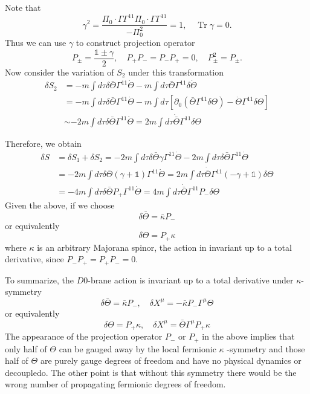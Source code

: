 \documentclass[graybox,envcountchap,sectrefs]{svmono}
\begin{document}
Note that
\begin{equation}
\gamma^{2}=\frac{\Pi_{0} \cdot \Gamma \Gamma^{11} \Pi_{0} \cdot \Gamma \Gamma^{11}}{-\Pi_{0}^{2}}=1, \quad \operatorname{Tr} \gamma=0.
\end{equation}
Thus we can use $\gamma$ to construct projection operator
\begin{equation}
P_{\pm}=\frac{\mathds{1} \pm \gamma}{2}, \quad P_{+} P_{-}=P_{-} P_{+}=0, \quad P_{\pm}^{2}=P_{\pm}.
\end{equation}
Now consider the variation of $S_{2}$ under this transformation
\begin{equation}
\begin{aligned}
\delta S_{2} &=-m \int d \tau \delta \bar{\Theta} \Gamma^{11} \dot{\Theta}-m \int d \tau \bar{\Theta} \Gamma^{11} \delta \dot{\Theta} \\
&=-m \int d \tau \delta \bar{\Theta} \Gamma^{11} \dot{\Theta}-m \int d \tau\left[\partial_{0}\left(\bar{\Theta} \Gamma^{11} \delta \Theta\right)-\dot{\Theta} \Gamma^{11} \delta \Theta\right] \\
& \sim-2 m \int d \tau \delta \bar{\Theta} \Gamma^{11} \dot{\Theta}=2 m \int d \tau \dot{\bar{\Theta}} \Gamma^{11} \delta \Theta
\end{aligned}
\end{equation}

Therefore, we obtain
\[
\begin{aligned}
\delta S &=\delta S_{1}+\delta S_{2}=-2 m \int d \tau \delta \bar{\Theta} \gamma \Gamma^{11} \dot{\Theta}-2 m \int d \tau \delta \bar{\Theta} \Gamma^{11} \dot{\Theta} \\
&=-2 m \int d \tau \delta \bar{\Theta}(\gamma+\mathds{1}) \Gamma^{11} \dot{\Theta}=2m \int d\tau  \dot{\bar{\Theta}}\Gamma^{11}(-\gamma+\mathds{1})  \delta \Theta \\
&=-4 m \int d \tau \delta \bar{\Theta} P_{+} \Gamma^{11} \dot{\Theta}=4 m \int d \tau \dot{\bar{\Theta}}\Gamma^{11} P_{-}  \delta \Theta
\end{aligned}
\]
Given the above, if we choose
\[
\delta \bar{\Theta}=\bar{\kappa} P_{-}
\]
or equivalently
\[
\delta \Theta=P_{+} \kappa
\]
where $\kappa$ is an arbitrary Majorana spinor, the action in invariant up to a total derivative, since $P_{-} P_{+}=P_{+} P_{-}=0$.


To summarize, the $D0$-brane action is invariant up to a total derivative under $\kappa$-symmetry
\begin{equation}
\delta \bar{\Theta}=\bar{\kappa} P_{-}, \quad \delta X^{\mu}=-\bar{\kappa} P_{-} \Gamma^{\mu} \Theta
\end{equation}
or equivalently
\begin{equation}
\delta \Theta=P_{+} \kappa, \quad \delta X^{\mu}=\bar{\Theta} \Gamma^{\mu} P_{+} \kappa
\end{equation}
The appearance of the projection operator $P_{-}$ or $P_{+}$ in the above implies that only half of $\Theta$ can be gauged away by the local fermionic $\kappa$ -symmetry and those half of $\Theta$ are purely gauge degrees of freedom and have no physical dynamics or decoupledo. The other point is that without this symmetry there would be the wrong number of propagating fermionic degrees of freedom.
\end{document}
